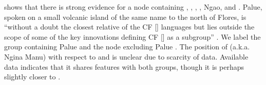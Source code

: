 \citet{Elias2018} shows that there is strong evidence for a node
containing , , , , Nga{\Q}o, and .
Palu{\Q}e, spoken on a small volcanic island of the same name
to the north of Flores,
is “without a doubt the closest relative of the CF [] languages but lies outside the scope of some of the
key innovations defining CF [] as a subgroup” \citep[85]{Elias2018}.
We label the group containing Palu{\Q}e 
and the node excluding Palu{\Q}e .
The position of  (a.k.a.
Ngina Manu) with respect to 
and  is unclear due to scarcity of data.
Available data indicates that it shares features
with both groups, though it is perhaps slightly closer to .

